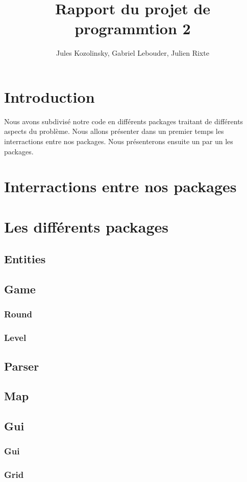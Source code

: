 \documentclass{article}
\title{Rapport du projet de programmtion 2}
\author{Jules Kozolinsky, Gabriel Lebouder, Julien Rixte}
\begin{document}
\maketitle

\section{Introduction}
  Nous avons subdivisé notre code en différents packages traitant de différents aspects du problème.
  Nous allons présenter dans un premier temps les interractions entre nos packages.
  Nous présenterons ensuite un par un les packages.

\section{Interractions entre nos packages}

\section{Les différents packages}

\subsection{Entities}

\subsection{Game}
\subsubsection{Round}
\subsubsection{Level}

\subsection{Parser}

\subsection{Map}

\subsection{Gui}
\subsubsection{Gui}
\subsubsection{Grid}
\end{document}
